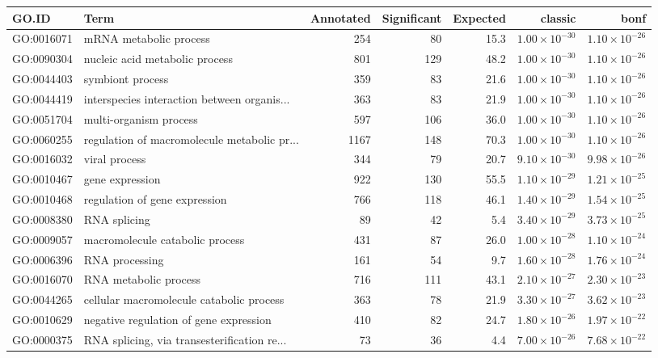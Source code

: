 \begin{table}[ht]
\centering
\begin{tabular}{llrrrrr}
  \hline
GO.ID & Term & Annotated & Significant & Expected & classic & bonf \\ 
  \hline
GO:0016071 & mRNA metabolic process & 254 & 80 & 15.3 & $1.00 \times 10^{-30}$ & $1.10 \times 10^{-26}$ \\ 
  GO:0090304 & nucleic acid metabolic process & 801 & 129 & 48.2 & $1.00 \times 10^{-30}$ & $1.10 \times 10^{-26}$ \\ 
  GO:0044403 & symbiont process & 359 & 83 & 21.6 & $1.00 \times 10^{-30}$ & $1.10 \times 10^{-26}$ \\ 
  GO:0044419 & interspecies interaction between organis... & 363 & 83 & 21.9 & $1.00 \times 10^{-30}$ & $1.10 \times 10^{-26}$ \\ 
  GO:0051704 & multi-organism process & 597 & 106 & 36.0 & $1.00 \times 10^{-30}$ & $1.10 \times 10^{-26}$ \\ 
  GO:0060255 & regulation of macromolecule metabolic pr... & 1167 & 148 & 70.3 & $1.00 \times 10^{-30}$ & $1.10 \times 10^{-26}$ \\ 
  GO:0016032 & viral process & 344 & 79 & 20.7 & $9.10 \times 10^{-30}$ & $9.98 \times 10^{-26}$ \\ 
  GO:0010467 & gene expression & 922 & 130 & 55.5 & $1.10 \times 10^{-29}$ & $1.21 \times 10^{-25}$ \\ 
  GO:0010468 & regulation of gene expression & 766 & 118 & 46.1 & $1.40 \times 10^{-29}$ & $1.54 \times 10^{-25}$ \\ 
  GO:0008380 & RNA splicing & 89 & 42 & 5.4 & $3.40 \times 10^{-29}$ & $3.73 \times 10^{-25}$ \\ 
  GO:0009057 & macromolecule catabolic process & 431 & 87 & 26.0 & $1.00 \times 10^{-28}$ & $1.10 \times 10^{-24}$ \\ 
  GO:0006396 & RNA processing & 161 & 54 & 9.7 & $1.60 \times 10^{-28}$ & $1.76 \times 10^{-24}$ \\ 
  GO:0016070 & RNA metabolic process & 716 & 111 & 43.1 & $2.10 \times 10^{-27}$ & $2.30 \times 10^{-23}$ \\ 
  GO:0044265 & cellular macromolecule catabolic process & 363 & 78 & 21.9 & $3.30 \times 10^{-27}$ & $3.62 \times 10^{-23}$ \\ 
  GO:0010629 & negative regulation of gene expression & 410 & 82 & 24.7 & $1.80 \times 10^{-26}$ & $1.97 \times 10^{-22}$ \\ 
  GO:0000375 & RNA splicing, via transesterification re... & 73 & 36 & 4.4 & $7.00 \times 10^{-26}$ & $7.68 \times 10^{-22}$ \\ 

\end{tabular}
\end{table}
